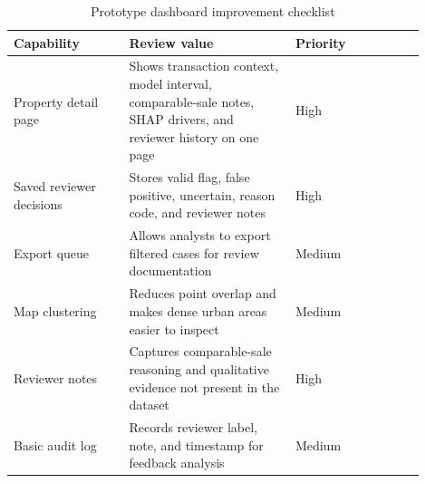 \documentclass[12pt,a4paper]{article}
\begin{document}
\begin{table}[H]
\centering
\caption{Prototype dashboard improvement checklist}
\label{tab:dashboard_checklist}
\begin{tabular}{p{0.25\linewidth}p{0.36\linewidth}p{0.29\linewidth}}
\toprule
\textbf{Capability} & \textbf{Review value} & \textbf{Priority}\\
\midrule
Property detail page & Shows transaction context, model interval, comparable-sale notes, SHAP drivers, and reviewer history on one page & High\\
Saved reviewer decisions & Stores valid flag, false positive, uncertain, reason code, and reviewer notes & High\\
Export queue & Allows analysts to export filtered cases for review documentation & Medium\\
Map clustering & Reduces point overlap and makes dense urban areas easier to inspect & Medium\\
Reviewer notes & Captures comparable-sale reasoning and qualitative evidence not present in the dataset & High\\
Basic audit log & Records reviewer label, note, and timestamp for feedback analysis & Medium\\
\bottomrule
\end{tabular}
\end{table}
\end{document}

